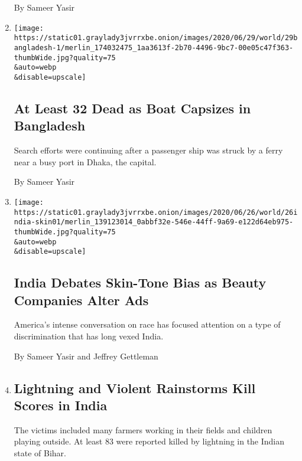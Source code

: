\begin{enumerate}
  By Sameer Yasir
\item
  \href{/2020/06/29/world/asia/bangladesh-ferry-capsize.html}{}

  \texttt{[image: https://static01.graylady3jvrrxbe.onion/images/2020/06/29/world/29bangladesh-1/merlin\_174032475\_1aa3613f-2b70-4496-9bc7-00e05c47f363-thumbWide.jpg?quality=75\\\&auto=webp\\\&disable=upscale]}

  \hypertarget{at-least-32-dead-as-boat-capsizes-in-bangladesh}{%
  \subsection{At Least 32 Dead as Boat Capsizes in
  Bangladesh}\label{at-least-32-dead-as-boat-capsizes-in-bangladesh}}

  Search efforts were continuing after a passenger ship was struck by a
  ferry near a busy port in Dhaka, the capital.

  By Sameer Yasir
\item
  \href{/2020/06/28/world/asia/india-skin-color-unilever.html}{}

  \texttt{[image: https://static01.graylady3jvrrxbe.onion/images/2020/06/26/world/26india-skin01/merlin\_139123014\_0abbf32e-546e-44ff-9a69-e122d64eb975-thumbWide.jpg?quality=75\\\&auto=webp\\\&disable=upscale]}

  \hypertarget{india-debates-skin-tone-bias-as-beauty-companies-alter-ads}{%
  \subsection{India Debates Skin-Tone Bias as Beauty Companies Alter
  Ads}\label{india-debates-skin-tone-bias-as-beauty-companies-alter-ads}}

  America's intense conversation on race has focused attention on a type
  of discrimination that has long vexed India.

  By Sameer Yasir and Jeffrey Gettleman
\item
  \href{/2020/06/25/world/asia/india-monsoon-lightning-rainstorms.html}{}

  \hypertarget{lightning-and-violent-rainstorms-kill-scores-in-india}{%
  \subsection{Lightning and Violent Rainstorms Kill Scores in
  India}\label{lightning-and-violent-rainstorms-kill-scores-in-india}}

  The victims included many farmers working in their fields and children
  playing outside. At least 83 were reported killed by lightning in the
  Indian state of Bihar.


\end{enumerate}
